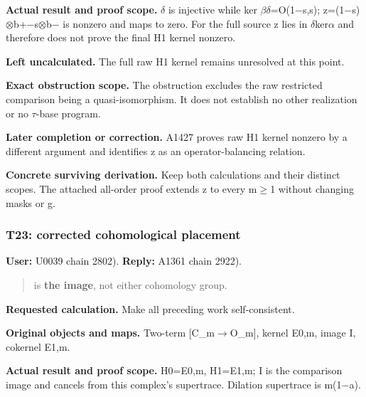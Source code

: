\documentclass[10pt,a4paper,oneside]{report}
\begin{document}
\textbf{Actual result and proof scope.}
\allowbreak{}\ensuremath{δ}\allowbreak{} is injective while ker
\allowbreak{}\ensuremath{β}\allowbreak{}\allowbreak{}\ensuremath{δ}\allowbreak{}=O(1\allowbreak{}\ensuremath{−}\allowbreak{}s,s);
z=(1\allowbreak{}\ensuremath{−}\allowbreak{}s)\allowbreak{}\ensuremath{⊗}\allowbreak{}b+\allowbreak{}\ensuremath{−}\allowbreak{}s\allowbreak{}\ensuremath{⊗}\allowbreak{}b\allowbreak{}\ensuremath{−}\allowbreak{}
is nonzero and maps to zero. For the full source z lies in
\allowbreak{}\ensuremath{δ}\allowbreak{}ker\allowbreak{}\ensuremath{α}\allowbreak{}
and therefore does not prove the final H1 kernel nonzero.

\textbf{Left uncalculated.} The full raw H1 kernel remains unresolved at
this point.

\textbf{Exact obstruction scope.} The obstruction excludes the raw
restricted comparison being a quasi-isomorphism. It does not establish
no other realization or no \allowbreak{}\ensuremath{τ}\allowbreak{}-base
program.

\textbf{Later completion or correction.} A1427 proves raw H1 kernel
nonzero by a different argument and identifies z as an
operator-balancing relation.

\textbf{Concrete surviving derivation.} Keep both calculations and their
distinct scopes. The attached all-order proof extends z to every
m\allowbreak{}\ensuremath{≥}\allowbreak{}1 without changing masks or g.

\subsubsection{T23: corrected cohomological
placement}\label{t23-corrected-cohomological-placement}

\textbf{User:} U0039
\protect{} chain 2802).
\textbf{Reply:} A1361
\protect{} chain 2922).

\begin{quote}
is \textbf{the image}, not either cohomology group.
\end{quote}

\textbf{Requested calculation.} Make all preceding work self-consistent.

\textbf{Original objects and maps.} Two-term
[C\_m\allowbreak{}\ensuremath{→}\allowbreak{}O\_m], kernel E0,m, image
I, cokernel E1,m.

\textbf{Actual result and proof scope.} H0=E0,m, H1=E1,m; I is the
comparison image and cancels from this complex's supertrace. Dilation
supertrace is m(1\allowbreak{}\ensuremath{−}\allowbreak{}a).
\end{document}
